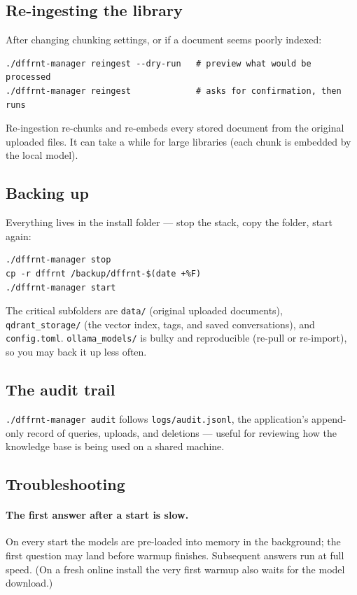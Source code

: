 \documentclass[11pt,letterpaper]{article}
\begin{document}
\subsection{Re-ingesting the library}

After changing chunking settings, or if a document seems poorly indexed:

\begin{lstlisting}
./dffrnt-manager reingest --dry-run   # preview what would be processed
./dffrnt-manager reingest             # asks for confirmation, then runs
\end{lstlisting}

Re-ingestion re-chunks and re-embeds every stored document from the original
uploaded files. It can take a while for large libraries (each chunk is
embedded by the local model).

\subsection{Backing up}

Everything lives in the install folder --- stop the stack, copy the folder,
start again:

\begin{lstlisting}
./dffrnt-manager stop
cp -r dffrnt /backup/dffrnt-$(date +%F)
./dffrnt-manager start
\end{lstlisting}

The critical subfolders are \texttt{data/} (original uploaded documents),
\texttt{qdrant\_storage/} (the vector index, tags, and saved conversations),
and \texttt{config.toml}. \texttt{ollama\_models/} is bulky and reproducible
(re-pull or re-import), so you may back it up less often.

\subsection{The audit trail}

\texttt{./dffrnt-manager audit} follows \texttt{logs/audit.jsonl}, the
application's append-only record of queries, uploads, and deletions ---
useful for reviewing how the knowledge base is being used on a shared
machine.

\subsection{Troubleshooting}

\paragraph{The first answer after a start is slow.}
On every start the models are pre-loaded into memory in the background; the
first question may land before warmup finishes. Subsequent answers run at
full speed. (On a fresh online install the very first warmup also waits for
the model download.)
\end{document}
